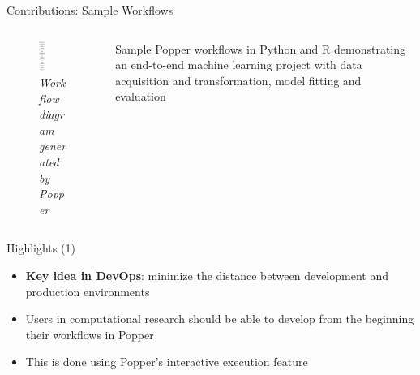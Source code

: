 \documentclass[10pt]{beamer}
\begin{document}
\begin{frame}{Contributions: Sample Workflows}
    \begin{columns}
        \begin{column}{0.5\textwidth} 
            \begin{center}
                \begin{figure}
                    \includegraphics[width=0.25\textwidth]{images/workflow.png}
                    \caption*{{\sl Workflow diagram generated by Popper}}
                \end{figure}
            \end{center}
        \end{column}
        \begin{column}{0.5\textwidth}
            Sample Popper workflows in Python and R demonstrating an end-to-end 
            machine learning project with data acquisition and transformation,
            model fitting and evaluation
        \end{column}
    \end{columns}   
\end{frame}

\begin{frame}{Highlights (1)}
    \begin{itemize}
        \item \textbf{Key idea in DevOps}: minimize the distance between development 
        and production environments 
        \item Users in computational research should be able to develop from the beginning their workflows in Popper 
        \item This is done using Popper's interactive execution feature
    \end{itemize}
\end{frame}
\end{document}
